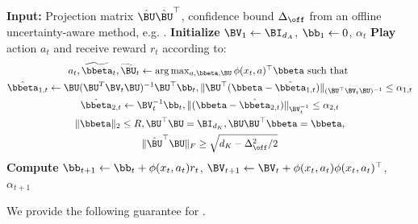 \begin{algorithm}[tbp!]
\centering
	\caption{}
    \label{alg:local-ucb}
	\begin{algorithmic}[1]
	    \STATE \textbf{Input:} Projection matrix $\hat \BU \hat \BU^\top$, confidence bound $\Delta_{\off}$ from an offline uncertainty-aware method, e.g. .
        \STATE \textbf{Initialize} $\BV_1 \gets \BI_{d_A}$, $\bb_1 \gets 0$, $\alpha_t$
            \STATE \textbf{Play} action $a_t$ and receive reward $r_t$ according to:
            \vspace*{-3mm}
            \begin{gather*}
                \textstyle{a_t, \widetilde \bbeta_t, \widetilde \BU_t \gets \arg\max_{a, \bbeta, \BU} \phi(x_t, a)^\top \bbeta} \text{ such that }\\
                \hat \bbeta_{1,t} \gets \BU (\BU^T \BV_{t} \BU)^{-1} \BU^\top \bb_t, \| \BU^\top (\bbeta - \hat \bbeta_{1,t})\|_{(\BU^\top \BV_t \BU)^{-1}} \leq \alpha_{1,t} \\
                \textstyle{\hat \bbeta_{2,t} \gets \BV_{t}^{-1} \bb_t, \| (\bbeta - \hat \bbeta_{2,t})\|_{\BV_t^{-1}} \leq \alpha_{2,t}}\\
                \|\bbeta\|_2 \leq R, \BU^\top \BU = \BI_{d_K}, \BU\BU^\top \bbeta = \bbeta, \\
                \|\hat \BU^\top \BU\|_F \geq \sqrt{d_K - \Delta_{\off}^2/2}
            \end{gather*}
            \vspace*{-6mm}
            \STATE \textbf{Compute} $\bb_{t+1} \gets \bb_t + \phi(x_t, a_t)r_t$, $\BV_{t+1} \gets \BV_t + \phi(x_t, a_t)\phi(x_t, a_t)^\top$, $\alpha_{t+1}$
        \ENDFOR
	\end{algorithmic}
\end{algorithm}

We provide the following guarantee for .

